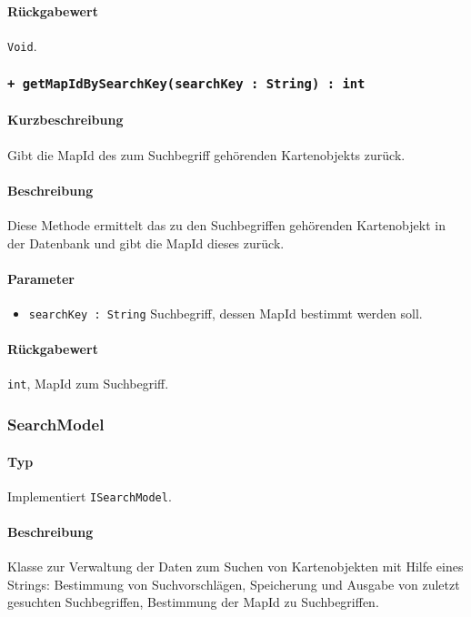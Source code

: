 \paragraph*{Rückgabewert}
\texttt{Void}.

 \subsubsection*{\texttt{+ getMapIdBySearchKey(searchKey : String) : int}}%
\paragraph*{Kurzbeschreibung}
Gibt die MapId des zum Suchbegriff gehörenden Kartenobjekts zurück.
\paragraph*{Beschreibung}
Diese Methode ermittelt das zu den Suchbegriffen gehörenden Kartenobjekt in der Datenbank und gibt die MapId dieses zurück.
\paragraph*{Parameter}
\begin{itemize}
    \item \texttt{searchKey : String} Suchbegriff, dessen MapId bestimmt werden soll.
\end{itemize}
\paragraph*{Rückgabewert}
\texttt{int}, MapId zum Suchbegriff.


\subsubsection{SearchModel}
\paragraph*{Typ}
Implementiert \texttt{ISearchModel}.
\paragraph*{Beschreibung}
Klasse zur Verwaltung der Daten zum Suchen von Kartenobjekten mit Hilfe eines Strings: 
Bestimmung von Suchvorschlägen, Speicherung und Ausgabe von zuletzt gesuchten Suchbegriffen, Bestimmung der MapId zu Suchbegriffen.